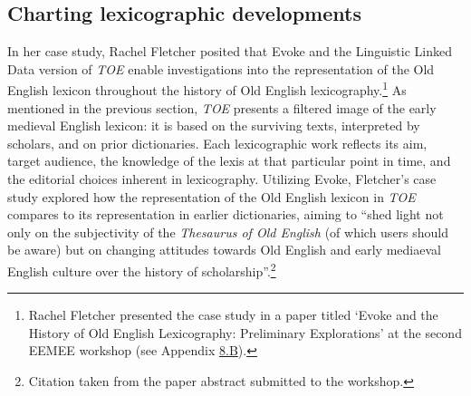 \subsection{Charting lexicographic developments}

In her case study, Rachel Fletcher posited that Evoke and the Linguistic Linked Data version of \textit{TOE} enable investigations into the representation of the Old English lexicon throughout the history of Old English lexicography.\footnote{Rachel Fletcher presented the case study in a paper titled `Evoke and the History of Old English Lexicography: Preliminary Explorations' at the second EEMEE workshop (see Appendix \hyperref[Appendix8.B]{8.B}).} 
As mentioned in the previous section, 
\textit{TOE} presents a filtered image of the early medieval English lexicon: it is based on the surviving texts, interpreted by scholars, and on prior dictionaries. Each lexicographic work reflects its aim, target audience, the knowledge of the lexis at that particular point in time, and the editorial choices inherent in lexicography. Utilizing Evoke, Fletcher's case study explored how the representation of the Old English lexicon in \textit{TOE} compares to its representation in earlier dictionaries, aiming to ``shed light not only on the subjectivity of the \textit{Thesaurus of Old English} (of which users should be aware) but on changing attitudes towards Old English and early mediaeval English culture over the history of scholarship''.\footnote{Citation taken from the paper abstract submitted to the workshop.}




